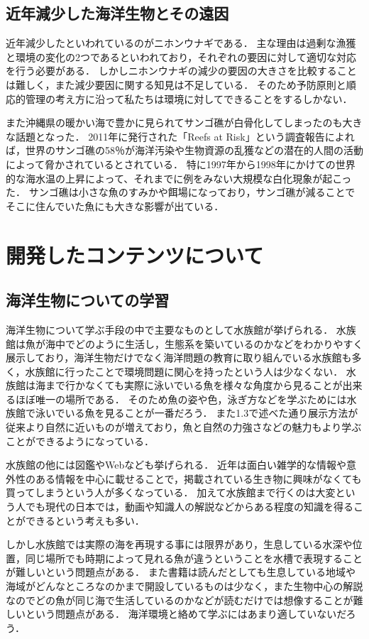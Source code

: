 \documentclass[12pt,a4j,titlepage]{ltjsarticle}
\begin{document}
\subsection{近年減少した海洋生物とその遠因}
近年減少したといわれているのがニホンウナギである．
主な理由は過剰な漁獲と環境の変化の2つであるといわれており，それぞれの要因に対して適切な対応を行う必要がある\cite{nihonunagi}．
しかしニホンウナギの減少の要因の大きさを比較することは難しく，また減少要因に関する知見は不足している．
そのため予防原則と順応的管理の考え方に沿って私たちは環境に対してできることをするしかない．\par
また沖縄県の暖かい海で豊かに見られてサンゴ礁が白骨化してしまったのも大きな話題となった．
2011年に発行された「Reefs at Risk」という調査報告によれば，世界のサンゴ礁の58％が海洋汚染や生物資源の乱獲などの潜在的人間の活動によって脅かされているとされている\cite{sango}．
特に1997年から1998年にかけての世界的な海水温の上昇によって、それまでに例をみない大規模な白化現象が起こった．
サンゴ礁は小さな魚のすみかや餌場になっており，サンゴ礁が減ることでそこに住んでいた魚にも大きな影響が出ている．
\clearpage


\section{開発したコンテンツについて}\label{開発したコンテンツ}
\subsection{海洋生物についての学習}
海洋生物について学ぶ手段の中で主要なものとして水族館が挙げられる．
水族館は魚が海中でどのように生活し，生態系を築いているのかなどをわかりやすく展示しており，海洋生物だけでなく海洋問題の教育に取り組んでいる水族館も多く，水族館に行ったことで環境問題に関心を持ったという人は少なくない．
水族館は海まで行かなくても実際に泳いでいる魚を様々な角度から見ることが出来るほぼ唯一の場所である．
そのため魚の姿や色，泳ぎ方などを学ぶためには水族館で泳いでいる魚を見ることが一番だろう．
また1.3で述べた通り展示方法が従来より自然に近いものが増えており，魚と自然の力強さなどの魅力もより学ぶことができるようになっている．\par
水族館の他には図鑑やWebなども挙げられる．
近年は面白い雑学的な情報や意外性のある情報を中心に載せることで，掲載されている生き物に興味がなくても買ってしまうという人が多くなっている．
加えて水族館まで行くのは大変という人でも現代の日本では，動画や知識人の解説などからある程度の知識を得ることができるという考えも多い．\par
しかし水族館では実際の海を再現する事には限界があり，生息している水深や位置，同じ場所でも時期によって見れる魚が違うということを水槽で表現することが難しいという問題点がある．
また書籍は読んだとしても生息している地域や海域がどんなところなのかまで開設しているものは少なく，また生物中心の解説なのでどの魚が同じ海で生活しているのかなどが読むだけでは想像することが難しいという問題点がある．
海洋環境と絡めて学ぶにはあまり適していないだろう．
\end{document}
